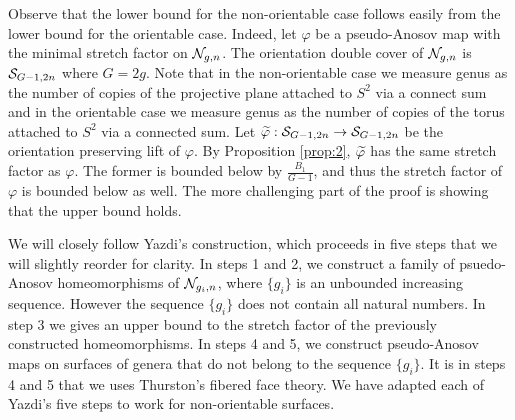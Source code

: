 
Observe that the lower bound for the non-orientable case follows easily from the lower bound for the orientable case.
Indeed, let $\varphi$ be a pseudo-Anosov map with the minimal stretch factor on $\mathcal{N}_{g,n}$. The orientation double cover of $\mathcal{N}_{g,n}$ is $\mathcal{S}_{G-1,2n}$ where $G=2g$.  Note that in the non-orientable case we measure genus as the number of copies of the projective plane attached to $S^2$ via a connect sum and in the orientable case we measure genus as the number of copies of the torus attached to $S^2$ via a connected sum. Let $\widetilde{\varphi}:\mathcal{S}_{G-1, 2n}\to\mathcal{S}_{G-1,2n}$ be the orientation preserving lift of $\varphi$.
By Proposition \ref{prop:2}, $\widetilde{\varphi}$ has the same
stretch factor as $\varphi$. The former is bounded below by $\frac{B_1}{G-1}$, and thus the stretch factor of $\varphi$ is bounded
below as well. The more challenging part of the proof is showing that the upper bound holds. %

We will closely follow Yazdi's construction, which proceeds in five steps that we will slightly reorder for clarity.  In steps 1 and 2, we construct a family of psuedo-Anosov homeomorphisms
of $\mathcal{N}_{g_i,n}$, where $\{g_i\}$ is an unbounded increasing sequence. However the sequence $\{g_i\}$ does not contain all natural numbers.  In step 3 we gives an upper bound to the stretch factor of the previously constructed homeomorphisms. In steps 4 and 5, we construct pseudo-Anosov maps on surfaces of genera that do not belong to the sequence $\{g_i\}$. It is in steps 4 and 5 that we uses
Thurston's fibered face theory. We have adapted  each of Yazdi's five steps to work for non-orientable surfaces.

